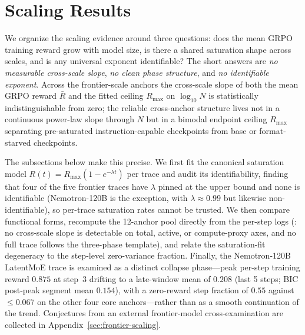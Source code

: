 \section{Scaling Results}
\label{sec:p1-results}
We organize the scaling evidence around three questions: does the mean GRPO training reward grow
with model size, is there a shared saturation shape across scales, and is any
universal exponent identifiable? The short answers are \emph{no measurable
cross-scale slope}, \emph{no clean phase structure}, and \emph{no identifiable
exponent}. Across the frontier-scale anchors the cross-scale slope of both the mean
GRPO reward $\bar{R}$ and the fitted ceiling $R_{\max}$ on $\log_{10} N$ is statistically indistinguishable from zero; the
reliable cross-anchor structure lives not in a continuous power-law slope through $N$ but in a bimodal endpoint ceiling
$R_{\max}$ separating pre-saturated instruction-capable checkpoints from base or format-starved checkpoints.

The subsections below make this precise. We first fit the canonical saturation
model $R(t) = R_{\max}(1 - e^{-\lambda t})$ per trace and audit its
identifiability, finding that four of the five frontier traces have $\lambda$
pinned at the upper bound and none is identifiable (Nemotron-120B is the exception,
with $\lambda\!\approx\!0.99$ but likewise non-identifiable), so per-trace saturation
rates cannot be trusted. We then compare functional forms, recompute the
12-anchor pool directly from the per-step logs (: no
cross-scale slope is detectable on total, active, or compute-proxy axes, and no
full trace follows the three-phase template), and relate the
saturation-fit degeneracy to the step-level zero-variance fraction. Finally, the Nemotron-120B LatentMoE trace is examined as a distinct collapse
phase---peak per-step training reward $0.875$ at step~3 drifting to a late-window mean of $0.208$ (last 5 steps; BIC post-peak segment mean $0.154$), with a
zero-reward step fraction of $0.55$ against $\le 0.067$ on the other four core anchors---rather than as a
smooth continuation of the trend. Conjectures from an external
frontier-model cross-examination are collected in
Appendix~\ref{sec:frontier-scaling}.
